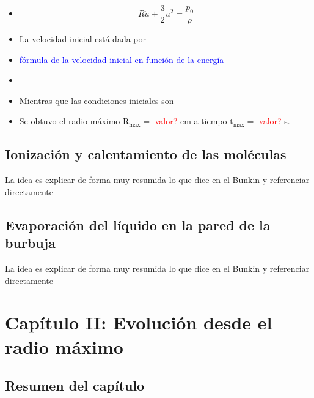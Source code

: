 \documentclass[aps,prb,twocolumn,superscriptaddress,floatfix,longbibliography,10pt]{revtex4-2}
\begin{document}
\begin{itemize}
  \item 
  \begin{equation}
    R \dot{u} + \frac{3}{2}u^2 = \frac{p_0}{\rho}
  \end{equation}


  \item La velocidad inicial está dada por 
  \item \textcolor{blue}{fórmula de la velocidad inicial en función de la energía}
  \item 
  \item Mientras que las condiciones iniciales son 
  \item Se obtuvo el radio máximo $\mathrm{R_{max}} = $ \textcolor{red}{valor?} cm a tiempo $\mathrm{t_{max}} = $ \textcolor{red}{valor?} s.
\end{itemize}


\subsection{Ionización y calentamiento de las moléculas}
La idea es explicar de forma muy resumida lo que dice en el Bunkin y referenciar directamente

\subsection{Evaporación del líquido en la pared de la burbuja}
La idea es explicar de forma muy resumida lo que dice en el Bunkin y referenciar directamente
























\section{Capítulo II: Evolución desde el radio máximo}

\subsection{Resumen del capítulo}
\end{document}
